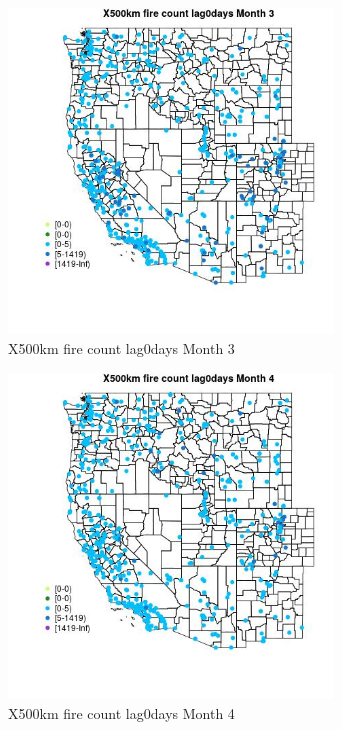 \begin{figure} 
\centering  
\includegraphics[width=0.77\textwidth]{Code_Outputs/Report_ML_input_PM25_Step4_part_e_de_duplicated_aves_compiled_2019-05-14wNAs_MapObsMo3X500km_fire_count_lag0days.jpg} 
\caption{\label{fig:Report_ML_input_PM25_Step4_part_e_de_duplicated_aves_compiled_2019-05-14wNAsMapObsMo3X500km_fire_count_lag0days}X500km fire count lag0days Month 3} 
\end{figure} 
 

\begin{figure} 
\centering  
\includegraphics[width=0.77\textwidth]{Code_Outputs/Report_ML_input_PM25_Step4_part_e_de_duplicated_aves_compiled_2019-05-14wNAs_MapObsMo4X500km_fire_count_lag0days.jpg} 
\caption{\label{fig:Report_ML_input_PM25_Step4_part_e_de_duplicated_aves_compiled_2019-05-14wNAsMapObsMo4X500km_fire_count_lag0days}X500km fire count lag0days Month 4} 
\end{figure} 
 

